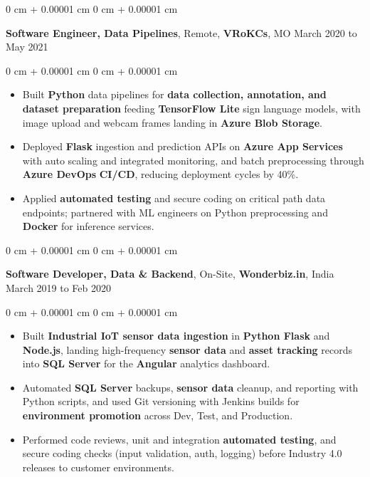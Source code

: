 \documentclass[10pt, letterpaper]{article}
\newenvironment{highlights}{
    \begin{itemize}[
        topsep=0.04 cm,
        parsep=0.04 cm,
        partopsep=0pt,
        itemsep=0pt,
        leftmargin=0 cm + 10pt
    ]
}{
    \end{itemize}
} %
\newenvironment{onecolentry}{
    \begin{adjustwidth}{
        0 cm + 0.00001 cm
    }{
        0 cm + 0.00001 cm
    }
}{
    \end{adjustwidth}
} %
\newcommand{\resumeheading}[2]{%
    \begin{onecolentry}
        #1 \hfill #2
    \end{onecolentry}
} %
\begin{document}
\vspace{0.15 cm}
\resumeheading{\textbf{Software Engineer, Data Pipelines}, Remote, \textbf{VRoKCs}, MO}{March 2020 to May 2021}
\begin{onecolentry}
\begin{highlights}
	\item Built \textbf{Python} data pipelines for \textbf{data collection, annotation, and dataset preparation} feeding \textbf{TensorFlow Lite} sign language models, with image upload and webcam frames landing in \textbf{Azure Blob Storage}.
	\item Deployed \textbf{Flask} ingestion and prediction APIs on \textbf{Azure App Services} with auto scaling and integrated monitoring, and batch preprocessing through \textbf{Azure DevOps} \textbf{CI/CD}, reducing deployment cycles by 40\%.
	\item Applied \textbf{automated testing} and secure coding on critical path data endpoints; partnered with ML engineers on Python preprocessing and \textbf{Docker} for inference services.
\end{highlights}
\end{onecolentry}





\vspace{0.15 cm}
\resumeheading{\textbf{Software Developer, Data \& Backend}, On-Site, \textbf{Wonderbiz.in}, India}{March 2019 to Feb 2020}

\begin{onecolentry}
\begin{highlights}
	\item Built \textbf{Industrial IoT sensor data ingestion} in \textbf{Python Flask} and \textbf{Node.js}, landing high-frequency \textbf{sensor data} and \textbf{asset tracking} records into \textbf{SQL Server} for the \textbf{Angular} analytics dashboard.
	\item Automated \textbf{SQL Server} backups, \textbf{sensor data} cleanup, and reporting with Python scripts, and used Git versioning with Jenkins builds for \textbf{environment promotion} across Dev, Test, and Production.
	\item Performed code reviews, unit and integration \textbf{automated testing}, and secure coding checks (input validation, auth, logging) before Industry 4.0 releases to customer environments.
\end{highlights}
\end{onecolentry}
\end{document}
